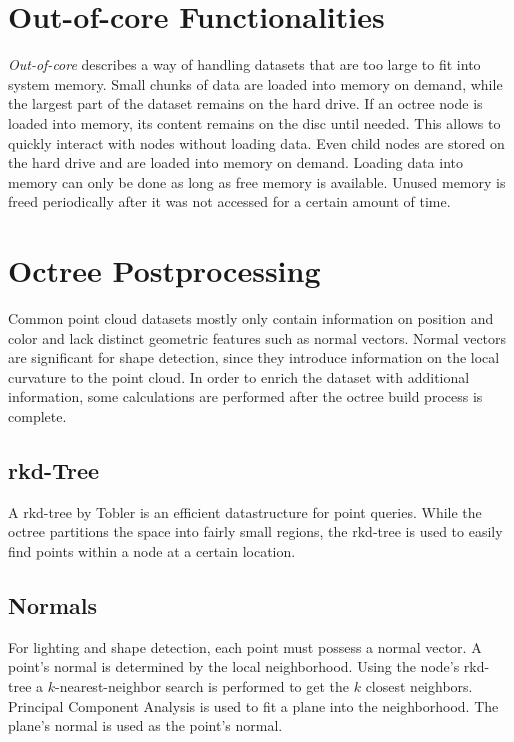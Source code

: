 \section{Out-of-core Functionalities}

\textit{Out-of-core} describes a way of handling datasets that are too large to fit into system memory. Small chunks of data are loaded into memory on demand, while the largest part of the dataset remains on the hard drive. If an octree node is loaded into memory, its content remains on the disc until needed. This allows to quickly interact with nodes without loading data. Even child nodes are stored on the hard drive and are loaded into memory on demand. 
Loading data into memory can only be done as long as free memory is available. Unused memory is freed periodically after it was not accessed for a certain amount of time. 


\section{Octree Postprocessing}

Common point cloud datasets mostly only contain information on position and color and lack distinct geometric features such as normal vectors. Normal vectors are significant for shape detection, since they introduce information on the local curvature to the point cloud.  In order to enrich the dataset with additional information, some calculations are performed after the octree build process is complete. 


\subsection{rkd-Tree}

A rkd-tree by Tobler\cite{tobler2011rkd} is an efficient datastructure for point queries. While the octree partitions the space into fairly small regions, the rkd-tree is used to easily find points within a node at a certain location. 


\subsection{Normals}

For lighting and shape detection, each point must possess a normal vector. A point's normal is determined by the local neighborhood. Using the node's rkd-tree a $k$-nearest-neighbor search is performed to get the $k$ closest neighbors. Principal Component Analysis\cite{jolliffe2002principal} is used to fit a plane into the neighborhood. The plane's normal is used as the point's normal.



